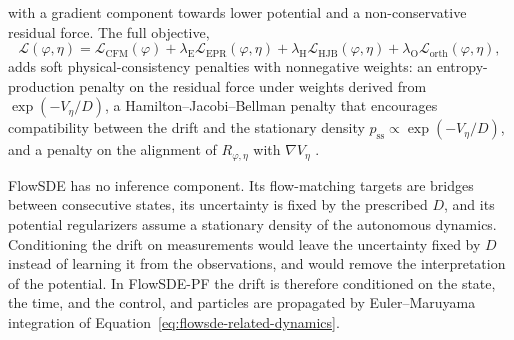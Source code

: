 with a gradient component towards lower potential and a non-conservative residual force. The full objective,
\begin{equation}\label{eq:flowsde-training-objective}
 \mathcal L(\varphi,\eta)
 =\mathcal L_{\mathrm{CFM}}(\varphi)
 +\lambda_{\mathrm E}\mathcal L_{\mathrm{EPR}}(\varphi,\eta)
 +\lambda_{\mathrm H}\mathcal L_{\mathrm{HJB}}(\varphi,\eta)
 +\lambda_{\mathrm O}\mathcal L_{\mathrm{orth}}(\varphi,\eta),
\end{equation}
adds soft physical-consistency penalties with nonnegative weights: an entropy-production penalty on the residual force under weights derived from $\exp(-V_\eta/D)$, a Hamilton--Jacobi--Bellman penalty that encourages compatibility between the drift and the stationary density $p_{\mathrm{ss}}\propto\exp(-V_\eta/D)$, and a penalty on the alignment of $R_{\varphi,\eta}$ with $\nabla V_\eta$ \citep[Sections~1.2--1.4]{lou2026flowsde_supp}.

FlowSDE has no inference component. Its flow-matching targets are bridges between consecutive states, its uncertainty is fixed by the prescribed $D$, and its potential regularizers assume a stationary density of the autonomous dynamics. Conditioning the drift on measurements would leave the uncertainty fixed by $D$ instead of learning it from the observations, and would remove the interpretation of the potential. In FlowSDE-PF the drift is therefore conditioned on the state, the time, and the control, and particles are propagated by Euler--Maruyama integration of Equation~\eqref{eq:flowsde-related-dynamics}.